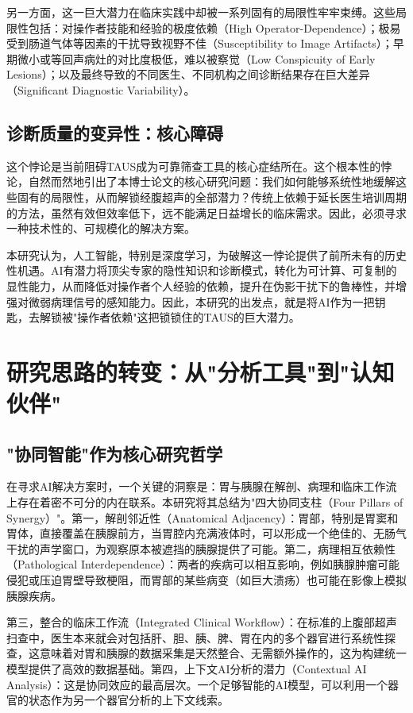 另一方面，这一巨大潜力在临床实践中却被一系列固有的局限性牢牢束缚。这些局限性包括：对操作者技能和经验的极度依赖（High Operator-Dependence）；极易受到肠道气体等因素的干扰导致视野不佳（Susceptibility to Image Artifacts）；早期微小或等回声病灶的对比度极低，难以被察觉（Low Conspicuity of Early Lesions）；以及最终导致的不同医生、不同机构之间诊断结果存在巨大差异（Significant Diagnostic Variability）。

\subsection{诊断质量的变异性：核心障碍}

这个悖论是当前阻碍TAUS成为可靠筛查工具的核心症结所在。这个根本性的悖论，自然而然地引出了本博士论文的核心研究问题：我们如何能够系统性地缓解这些固有的局限性，从而解锁经腹超声的全部潜力？传统上依赖于延长医生培训周期的方法，虽然有效但效率低下，远不能满足日益增长的临床需求。因此，必须寻求一种技术性的、可规模化的解决方案。

本研究认为，人工智能，特别是深度学习，为破解这一悖论提供了前所未有的历史性机遇。AI有潜力将顶尖专家的隐性知识和诊断模式，转化为可计算、可复制的显性能力，从而降低对操作者个人经验的依赖，提升在伪影干扰下的鲁棒性，并增强对微弱病理信号的感知能力。因此，本研究的出发点，就是将AI作为一把钥匙，去解锁被"操作者依赖"这把锁锁住的TAUS的巨大潜力。

\section{研究思路的转变：从"分析工具"到"认知伙伴"}

\subsection{"协同智能"作为核心研究哲学}

在寻求AI解决方案时，一个关键的洞察是：胃与胰腺在解剖、病理和临床工作流上存在着密不可分的内在联系。本研究将其总结为"四大协同支柱（Four Pillars of Synergy）"。第一，解剖邻近性（Anatomical Adjacency）：胃部，特别是胃窦和胃体，直接覆盖在胰腺前方，当胃腔内充满液体时，可以形成一个绝佳的、无肠气干扰的声学窗口，为观察原本被遮挡的胰腺提供了可能。第二，病理相互依赖性（Pathological Interdependence）：两者的疾病可以相互影响，例如胰腺肿瘤可能侵犯或压迫胃壁导致梗阻，而胃部的某些病变（如巨大溃疡）也可能在影像上模拟胰腺疾病。

第三，整合的临床工作流（Integrated Clinical Workflow）：在标准的上腹部超声扫查中，医生本来就会对包括肝、胆、胰、脾、胃在内的多个器官进行系统性探查，这意味着对胃和胰腺的数据采集是天然整合、无需额外操作的，这为构建统一模型提供了高效的数据基础。第四，上下文AI分析的潜力（Contextual AI Analysis）：这是协同效应的最高层次。一个足够智能的AI模型，可以利用一个器官的状态作为另一个器官分析的上下文线索。

